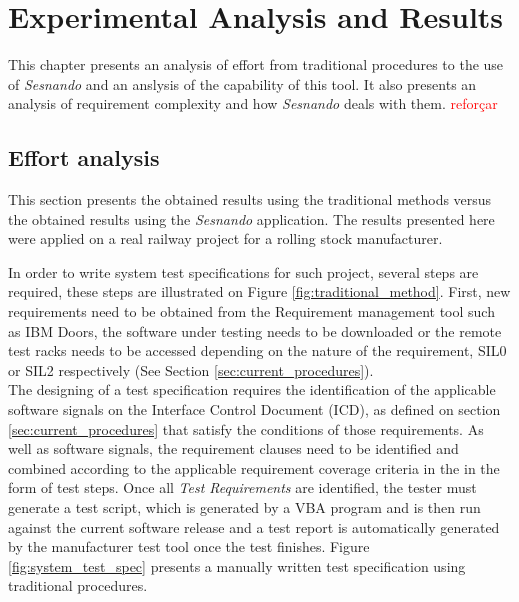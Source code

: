 \chapter{Experimental Analysis and Results}
\label{ch:results}

This chapter presents an analysis of effort from traditional procedures to the use of \textit{Sesnando} and an anslysis of the capability of this tool. It also presents an analysis of requirement complexity and how \textit{Sesnando} deals with them. \textcolor{red}{reforçar}

\section{Effort analysis}
\label{subsec:results_effor_analysis}

This section presents the obtained results using the traditional methods versus the obtained results using the \textit{Sesnando} application. The results presented here were applied on a real railway project for a rolling stock manufacturer.

In order to write system test specifications for such project, several steps are required, these steps are illustrated on Figure \ref{fig:traditional_method}. First, new requirements need to be obtained from the Requirement management tool such as IBM Doors, the software under testing needs to be downloaded or the remote test racks needs to be accessed depending on the nature of the requirement, SIL0 or SIL2 respectively (See Section \ref{sec:current_procedures}).\\

The designing of a test specification requires the identification of the applicable software signals on the Interface Control Document (ICD), as defined on section \ref{sec:current_procedures} that satisfy the conditions of those requirements. As well as software signals, the requirement clauses need to be identified and combined according to the applicable requirement coverage criteria in the in the form of test steps. Once all \textit{Test Requirements} are identified, the tester must generate a test script, which is generated by a VBA program and is then run against the current software release and a test report is automatically generated by the manufacturer test tool once the test finishes. Figure \ref{fig:system_test_spec} presents a manually written test specification using traditional procedures.

